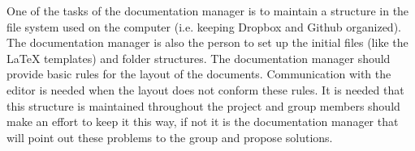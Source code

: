 One of the tasks of the documentation manager is to maintain a structure in the file system used on the computer (i.e. keeping Dropbox and Github organized). The documentation manager is also the person to set up the initial files (like the LaTeX templates) and folder structures. The documentation manager should provide basic rules for the layout of the documents. Communication with the editor is needed when the layout does not conform these rules. It is needed that this structure is maintained throughout the project and group members should make an effort to keep it this way, if not it is the documentation manager that will point out these problems to the group and propose solutions.